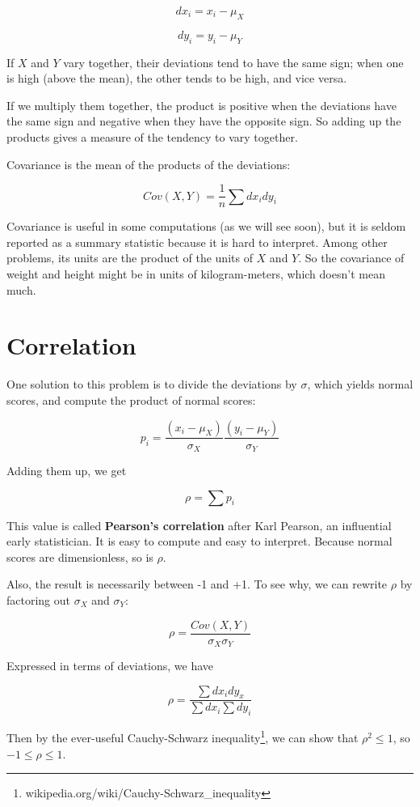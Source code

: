 \documentclass[12pt]{book}
\begin{document}
\[ dx_i = x_i - \mu_X \]

\[ dy_i = y_i - \mu_Y \]

If $X$ and $Y$ vary together, their deviations tend to have the
same sign; when one is high (above the mean), the other tends to be
high, and vice versa.  

If we multiply them together, the product is positive when the
deviations have the same sign and negative when they have the opposite
sign.  So adding up the products gives a measure of the tendency to
vary together.

Covariance is the mean of the products of the deviations:

\[ Cov(X,Y) = \frac{1}{n} \sum dx_i dy_i \]

Covariance is useful in some computations (as we will see soon), but
it is seldom reported as a summary statistic because it is hard to
interpret.  Among other problems, its units are the product of the
units of $X$ and $Y$.  So the covariance of weight and height might be
in units of kilogram-meters, which doesn't mean much.


\section{Correlation}

One solution to this problem is to divide the deviations by $\sigma$,
which yields normal scores, and compute the product of normal scores:

\[ p_i = \frac{(x_i - \mu_X)}{\sigma_X} \frac{(y_i - \mu_Y)}{\sigma_Y} \]

Adding them up, we get 

\[ \rho = \sum p_i \]

This value is called {\bf Pearson's correlation} after Karl Pearson,
an influential early statistician.  It is easy to compute and easy to
interpret.  Because normal scores are dimensionless, so is $\rho$.

Also, the result is necessarily between -1 and +1.  To see why, we
can rewrite $\rho$ by factoring out $\sigma_X$ and $\sigma_Y$:

\[ \rho = \frac{Cov(X,Y)}{\sigma_X \sigma_Y} \]

Expressed in terms of deviations, we have

\[ \rho = \frac{\sum dx_i dy_x}{\sum dx_i \sum dy_i} \]

Then by the ever-useful Cauchy-Schwarz
inequality\footnote{wikipedia.org/wiki/Cauchy-Schwarz\_inequality}, we
can show that $\rho^2 \le 1$, so $-1 \le \rho \le 1$.
\end{document}
